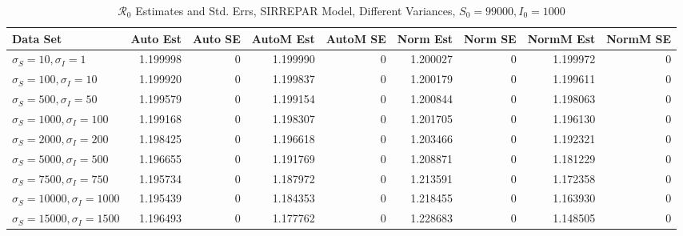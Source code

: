 \documentclass[12pt]{article}
\newcommand{\rr}{\ensuremath{\mathcal{R}_0}}
\begin{document}
\begin{table} [H]
	
	\caption{$\rr$ Estimates and Std. Errs, SIRREPAR Model,
		Different Variances, 
		$S_0 = 99000, I_0 = 1000$}
	\begin{footnotesize}
		\hskip -1.7cm
	\begin{tabular}{l|r|r|r|r|r|r|r|r}
		\hline
		Data Set & Auto Est & Auto SE & AutoM Est & AutoM SE & Norm Est & Norm SE & NormM Est & NormM SE\\
		\hline
		$\sigma_S = 10, \sigma_I = 1$ & 1.199998 & 0 & 1.199990 & 0 & 1.200027 & 0 & 1.199972 & 0\\
		\hline
		$\sigma_S = 100, \sigma_I = 10$ & 1.199920 & 0 & 1.199837 & 0 & 1.200179 & 0 & 1.199611 & 0\\
		\hline
		$\sigma_S = 500, \sigma_I = 50$ & 1.199579 & 0 & 1.199154 & 0 & 1.200844 & 0 & 1.198063 & 0\\
		\hline
		$\sigma_S = 1000, \sigma_I = 100$ & 1.199168 & 0 & 1.198307 & 0 & 1.201705 & 0 & 1.196130 & 0\\
		\hline
		$\sigma_S = 2000, \sigma_I = 200$ & 1.198425 & 0 & 1.196618 & 0 & 1.203466 & 0 & 1.192321 & 0\\
		\hline
		$\sigma_S = 5000, \sigma_I = 500$ & 1.196655 & 0 & 1.191769 & 0 & 1.208871 & 0 & 1.181229 & 0\\
		\hline
		$\sigma_S = 7500, \sigma_I = 750$ & 1.195734 & 0 & 1.187972 & 0 & 1.213591 & 0 & 1.172358 & 0\\
		\hline
		$\sigma_S = 10000, \sigma_I = 1000$ & 1.195439 & 0 & 1.184353 & 0 & 1.218455 & 0 & 1.163930 & 0\\
		\hline
		$\sigma_S = 15000, \sigma_I = 1500$ & 1.196493 & 0 & 1.177762 & 0 & 1.228683 & 0 & 1.148505 & 0\\
		\hline
	\end{tabular}
	\end{footnotesize}
\end{table}
\end{document}
